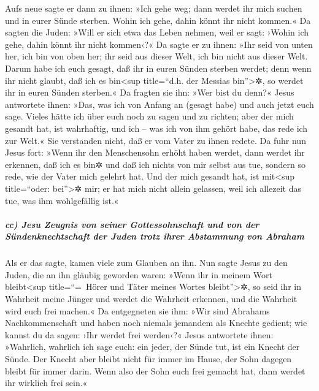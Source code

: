  Aufs neue sagte er dann zu ihnen: »Ich gehe weg; dann
werdet ihr mich suchen und in eurer Sünde sterben. Wohin ich gehe, dahin
könnt ihr nicht kommen.«  Da sagten die Juden: »Will er
sich etwa das Leben nehmen, weil er sagt: ›Wohin ich gehe, dahin könnt
ihr nicht kommen‹?«  Da sagte er zu ihnen: »Ihr seid von
unten her, ich bin von oben her; ihr seid aus dieser Welt, ich bin nicht
aus dieser Welt.  Darum habe ich euch gesagt, daß ihr in
euren Sünden sterben werdet; denn wenn ihr nicht glaubt, daß ich es
bin\textless sup title=``d.h. der Messias bin''\textgreater✲, so werdet
ihr in euren Sünden sterben.«  Da fragten sie ihn: »Wer
bist du denn?« Jesus antwortete ihnen: »Das, was ich von Anfang an
(gesagt habe) und auch jetzt euch sage.  Vieles hätte ich
über euch noch zu sagen und zu richten; aber der mich gesandt hat, ist
wahrhaftig, und ich -- was ich von ihm gehört habe, das rede ich zur
Welt.«  Sie verstanden nicht, daß er vom Vater zu ihnen
redete.  Da fuhr nun Jesus fort: »Wenn ihr den
Menschensohn erhöht haben werdet, dann werdet ihr erkennen, daß ich es
bin✲ und daß ich nichts von mir selbst aus tue, sondern so rede, wie der
Vater mich gelehrt hat.  Und der mich gesandt hat, ist
mit\textless sup title=``oder: bei''\textgreater✲ mir; er hat mich nicht
allein gelassen, weil ich allezeit das tue, was ihm wohlgefällig ist.«

\hypertarget{cc-jesu-zeugnis-von-seiner-gottessohnschaft-und-von-der-suxfcndenknechtschaft-der-juden-trotz-ihrer-abstammung-von-abraham}{%
\subparagraph{cc) Jesu Zeugnis von seiner Gottessohnschaft und von der
Sündenknechtschaft der Juden trotz ihrer Abstammung von
Abraham}\label{cc-jesu-zeugnis-von-seiner-gottessohnschaft-und-von-der-suxfcndenknechtschaft-der-juden-trotz-ihrer-abstammung-von-abraham}}

 Als er das sagte, kamen viele zum Glauben an ihn.
 Nun sagte Jesus zu den Juden, die an ihn gläubig
geworden waren: »Wenn ihr in meinem Wort bleibt\textless sup
title=``=~Hörer und Täter meines Wortes bleibt''\textgreater✲, so seid
ihr in Wahrheit meine Jünger  und werdet die Wahrheit
erkennen, und die Wahrheit wird euch frei machen.«  Da
entgegneten sie ihm: »Wir sind Abrahams Nachkommenschaft und haben noch
niemals jemandem als Knechte gedient; wie kannst du da sagen: ›Ihr
werdet frei werden‹?«  Jesus antwortete ihnen: »Wahrlich,
wahrlich ich sage euch: ein jeder, der Sünde tut, ist ein Knecht der
Sünde.  Der Knecht aber bleibt nicht für immer im Hause,
der Sohn dagegen bleibt für immer darin.  Wenn also der
Sohn euch frei gemacht hat, dann werdet ihr wirklich frei sein.«

